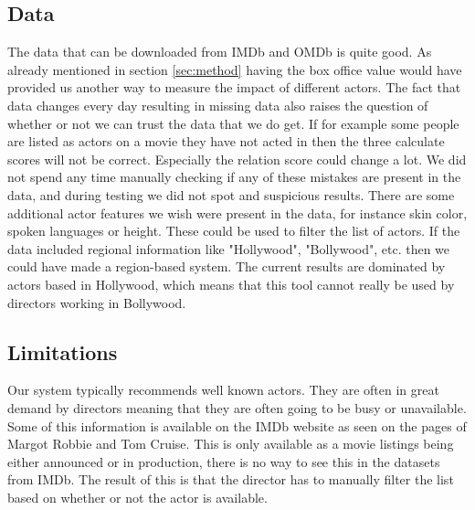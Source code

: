 \subsection{Data}
The data that can be downloaded from IMDb and OMDb is quite good. As already mentioned in section \ref{sec:method} having the box office value would have provided us another way to measure the impact of different actors. The fact that data changes every day resulting in missing data also raises the question of whether or not we can trust the data that we do get. If for example some people are listed as actors on a movie they have not acted in then the three calculate scores will not be correct. Especially the relation score could change a lot. We did not spend any time manually checking if any of these mistakes are present in the data, and during testing we did not spot and suspicious results. There are some additional actor features we wish were present in the data, for instance skin color, spoken languages or height. These could be used to filter the list of actors. If the data included regional information like "Hollywood", "Bollywood", etc. then we could have made a region-based system. The current results are dominated by actors based in Hollywood, which means that this tool cannot really be used by directors working in Bollywood.

\subsection{Limitations}
Our system typically recommends well known actors. They are often in great demand by directors meaning that they are often going to be busy or unavailable. Some of this information is available on the IMDb website as seen on the pages of Margot Robbie\cite{imdbMargot} and Tom Cruise\cite{imdbTom}. This is only available as a movie listings being either announced or in production, there is no way to see this in the datasets from IMDb. The result of this is that the director has to manually filter the list based on whether or not the actor is available. 
